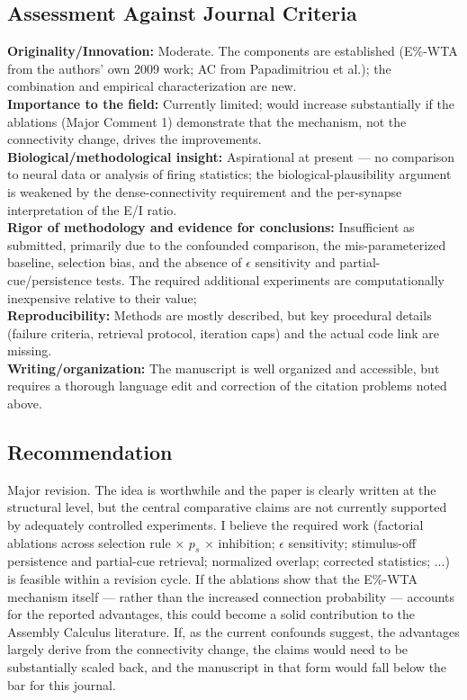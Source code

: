 \documentclass[a4paper, 11pt]{article}
\begin{document}
\subsection*{Assessment Against Journal Criteria}
\noindent\textbf{Originality/Innovation:} Moderate. The components are established (E\%-WTA from the authors' own 2009 work; AC from Papadimitriou et al.); the combination and empirical characterization are new.\\

\noindent\textbf{Importance to the field:} Currently limited; would increase substantially if the ablations (Major Comment 1) demonstrate that the mechanism, not the connectivity change, drives the improvements.\\

\noindent\textbf{Biological/methodological insight:} Aspirational at present — no comparison to neural data or analysis of firing statistics; the biological-plausibility argument is weakened by the dense-connectivity requirement and the per-synapse interpretation of the E/I ratio.\\

\noindent \textbf{Rigor of methodology and evidence for conclusions:} Insufficient as submitted, primarily due to the confounded comparison, the mis-parameterized baseline, selection bias, and the absence of $\epsilon$ sensitivity and partial-cue/persistence tests. The required additional experiments are computationally inexpensive relative to their value;\\

\noindent \textbf{Reproducibility:} Methods are mostly described, but key procedural details (failure criteria, retrieval protocol, iteration caps) and the actual code link are missing.\\

\noindent \textbf{Writing/organization:} The manuscript is well organized and accessible, but requires a thorough language edit and correction of the citation problems noted above.

\subsection*{Recommendation}
Major revision. The idea is worthwhile and the paper is clearly written at the structural level, but the central comparative claims are not currently supported by adequately controlled experiments. I believe the required work (factorial ablations across selection rule $\times$ $p_s$ $\times$ inhibition; $\epsilon$ sensitivity; stimulus-off persistence and partial-cue retrieval; normalized overlap; corrected statistics; ...) is feasible within a revision cycle. If the ablations show that the E\%-WTA mechanism itself — rather than the increased connection probability — accounts for the reported advantages, this could become a solid contribution to the Assembly Calculus literature. If, as the current confounds suggest, the advantages largely derive from the connectivity change, the claims would need to be substantially scaled back, and the manuscript in that form would fall below the bar for this journal.
\end{document}
